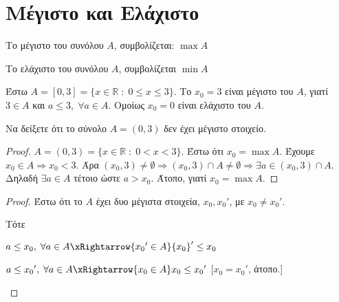\documentclass[main.tex]{subfiles}
\begin{document}
\section{Μέγιστο και Ελάχιστο}


\begin{rem}
\item {}
  \begin{myitemize}
    \item Το μέγιστο του συνόλου $A$, συμβολίζεται: $ \max A $
    \item Το ελάχιστο του συνόλου $A$, συμβολίζεται $ \min A $
  \end{myitemize}
\end{rem}

\begin{example}
  Έστω $ A = [0,3] = \{ x \in \mathbb{R} \; : \; 0 \leq x \leq 3 \} $. 
  Το $ x_{0}= 3 $ είναι μέγιστο του $A$, γιατί $ 3 \in A $ και 
  $ a \leq 3, \; \forall a \in A $. Ομοίως $ x_{0}= 0 $ είναι ελάχιστο 
  του $A$.
\end{example}

\begin{example}
  Να δείξετε ότι το σύνολο $ A = (0,3) $ δεν έχει μέγιστο στοιχείο.
\end{example}


\begin{proof}
\item {}
  $ A = (0,3) = \{ x \in \mathbb{R} \; : \; 0 < x < 3 \} $. 
  Έστω ότι $ x_{0} = \max A $. Έχουμε  $ x_{0} \in A \Rightarrow  x_{0} 
  < 3$. Άρα  $ (x_{0}, 3) \neq \emptyset \Rightarrow (x_{0},3) \cap A \neq 
  \emptyset \Rightarrow \exists a \in (x_{0},3) \cap A $. Δηλαδή $ 
  \exists a \in A$ τέτοιο ώστε $ a > x_{0} $. Άτοπο, γιατί $ x_{0}= \max A $.
\end{proof}




\begin{proof}
  Έστω ότι το $A$ έχει δυο μέγιστα στοιχεία,  $ x_{0}, {x_{0}}' $,  με 
  $ x_{0} \neq {x_{0}}'$. 

  Τότε 
  \begin{myitemize}
    \item $ a \leq x_{0}, \; \forall a \in A \xRightarrow{{x_{0}}' 
      \in A } {x_{0}}'  \leq x_{0} $ 
    \item $ a \leq {x_{0}}', \; \forall a \in A \xRightarrow{x_{0} 
      \in A } x_{0} \leq {x_{0}}' $ 
      [$ x_{0} = {x_{0}}' $, άτοπο.] 
  \end{myitemize}
\end{proof}
\end{document}
